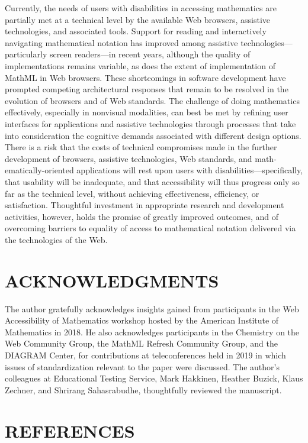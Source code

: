 \documentclass[11.5pt]{sig-alternate} %
\begin{document}
\begin{large}
Currently, the needs of users with disabilities in accessing mathematics are partially met at a technical level by the available Web browsers, assistive technologies, and associated tools. Support for reading and interactively navigating mathematical notation has improved among assistive technologies—particularly screen readers—in recent years, although the quality of implementations remains variable, as does the extent of implementation of MathML in Web browsers. These shortcomings in software development have prompted competing architectural responses that remain to be resolved in the evolution of browsers and of Web standards. The challenge of doing mathematics effectively, especially in nonvisual modalities, can best be met by refining user interfaces for applications and assistive technologies through processes that take into consideration the cognitive demands associated with different design options. There is a risk that the costs of technical compromises made in the further development of browsers, assistive technologies, Web standards, and math-ematically-oriented applications will rest upon users with disabilities—specifically, that usability will be inadequate, and that accessibility will thus progress only so far as the technical level, without achieving effectiveness, efficiency, or satisfaction. Thoughtful investment in appropriate research and development activities, however, holds the promise of greatly improved outcomes, and of overcoming barriers to equality of access to mathematical notation delivered via the technologies of the Web.

\section*{ACKNOWLEDGMENTS}

The author gratefully acknowledges insights gained from participants in the Web Accessibility of Mathematics workshop hosted by the American Institute of Mathematics in 2018. He also acknowledges participants in the Chemistry on the Web Community Group, the MathML Refresh Community Group, and the DIAGRAM Center, for contributions at teleconferences held in 2019 in which issues of standardization relevant to the paper were discussed. The author’s colleagues at Educational Testing Service, Mark Hakkinen, Heather Buzick, Klaus Zechner, and Shrirang Sahasrabudhe, thoughtfully reviewed the manuscript.

\end{large}
\clearpage
\section*{REFERENCES}\par 
\end{document}
